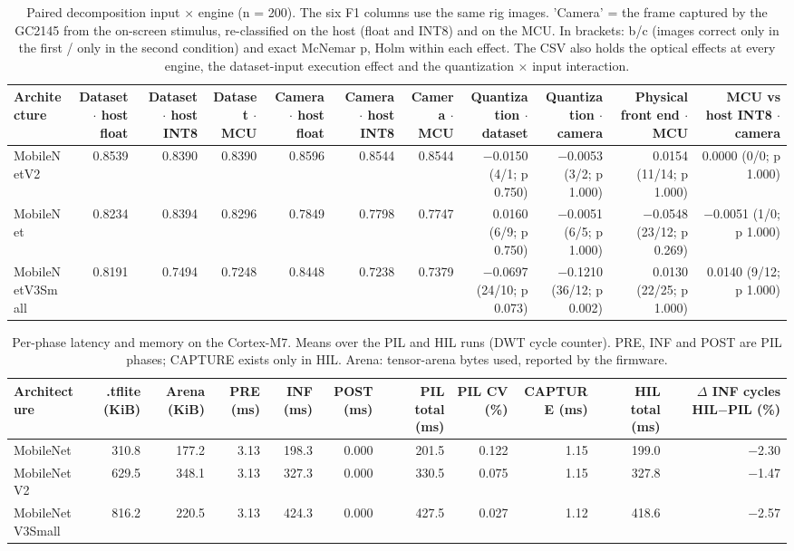 \begin{table}[htbp]
\centering
\scriptsize
\caption{Paired decomposition input $\times$ engine (n = 200). The six F1 columns use the same rig images. 'Camera' = the frame captured by the GC2145 from the on-screen stimulus, re-classified on the host (float and INT8) and on the MCU. In brackets: b/c (images correct only in the first / only in the second condition) and exact McNemar p, Holm within each effect. The CSV also holds the optical effects at every engine, the dataset-input execution effect and the quantization $\times$ input interaction.}
\label{tab:ladder-coco-niclavision-2}
\begin{tabular}{lrrrrrrrrrr}
\toprule
Architecture & Dataset $\cdot$ host float & Dataset $\cdot$ host INT8 & Dataset $\cdot$ MCU & Camera $\cdot$ host float & Camera $\cdot$ host INT8 & Camera $\cdot$ MCU & Quantization $\cdot$ dataset & Quantization $\cdot$ camera & Physical front end $\cdot$ MCU & MCU vs host INT8 $\cdot$ camera \\
\midrule
MobileNetV2 & 0.8539 & 0.8390 & 0.8390 & 0.8596 & 0.8544 & 0.8544 & $-$0.0150 (4/1; p 0.750) & $-$0.0053 (3/2; p 1.000) & 0.0154 (11/14; p 1.000) & 0.0000 (0/0; p 1.000) \\
MobileNet & 0.8234 & 0.8394 & 0.8296 & 0.7849 & 0.7798 & 0.7747 & 0.0160 (6/9; p 0.750) & $-$0.0051 (6/5; p 1.000) & $-$0.0548 (23/12; p 0.269) & $-$0.0051 (1/0; p 1.000) \\
MobileNetV3Small & 0.8191 & 0.7494 & 0.7248 & 0.8448 & 0.7238 & 0.7379 & $-$0.0697 (24/10; p 0.073) & $-$0.1210 (36/12; p 0.002) & 0.0130 (22/25; p 1.000) & 0.0140 (9/12; p 1.000) \\
\bottomrule
\end{tabular}
\end{table}

\begin{table}[htbp]
\centering
\scriptsize
\caption{Per-phase latency and memory on the Cortex-M7. Means over the PIL and HIL runs (DWT cycle counter). PRE, INF and POST are PIL phases; CAPTURE exists only in HIL. Arena: tensor-arena bytes used, reported by the firmware.}
\label{tab:ladder-coco-niclavision-3}
\begin{tabular}{lrrrrrrrrrr}
\toprule
Architecture & .tflite (KiB) & Arena (KiB) & PRE (ms) & INF (ms) & POST (ms) & PIL total (ms) & PIL CV (\%) & CAPTURE (ms) & HIL total (ms) & $\Delta$ INF cycles HIL$-$PIL (\%) \\
\midrule
MobileNet & 310.8 & 177.2 & 3.13 & 198.3 & 0.000 & 201.5 & 0.122 & 1.15 & 199.0 & $-$2.30 \\
MobileNetV2 & 629.5 & 348.1 & 3.13 & 327.3 & 0.000 & 330.5 & 0.075 & 1.15 & 327.8 & $-$1.47 \\
MobileNetV3Small & 816.2 & 220.5 & 3.13 & 424.3 & 0.000 & 427.5 & 0.027 & 1.12 & 418.6 & $-$2.57 \\
\bottomrule
\end{tabular}
\end{table}

